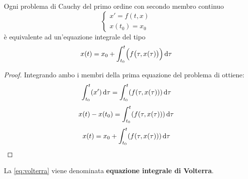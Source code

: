 \begin{proposition}
	Ogni problema di Cauchy del primo ordine con secondo membro continuo
	\[\begin{cases}x'=f(t,x)\\x(t_0)=x_0\end{cases}\]
	è equivalente ad un'equazione integrale del tipo
	\begin{equation}
		\label{eq:volterra}
		x(t)=x_0+\int_{t_0}^{t}\Bigl(f\bigl(\tau,x(\tau)\bigr)\Bigr)\,\mathrm{d}{\tau}
	\end{equation}
	\begin{proof}
		Integrando ambo i membri della prima equazione del problema di ottiene:
		\[\int_{t_0}^{t}( x')\,\mathrm{d}{\tau}=\int_{t_0}^{t}(f(\tau,x(\tau)))\,\mathrm{d}{\tau}\]
		\[x(t)-x(t_0)=\int_{t_0}^{t}(f(\tau,x(\tau)))\,\mathrm{d}{\tau}\]
		\[x(t)=x_0+\int_{t_0}^{t}(f(\tau,x(\tau)))\,\mathrm{d}{\tau}\]
	\end{proof}
\end{proposition}
\begin{definition}
	\label{def:equaz_volterra}
	La \cref{eq:volterra} viene denominata \textbf{equazione integrale di Volterra}.
\end{definition}

